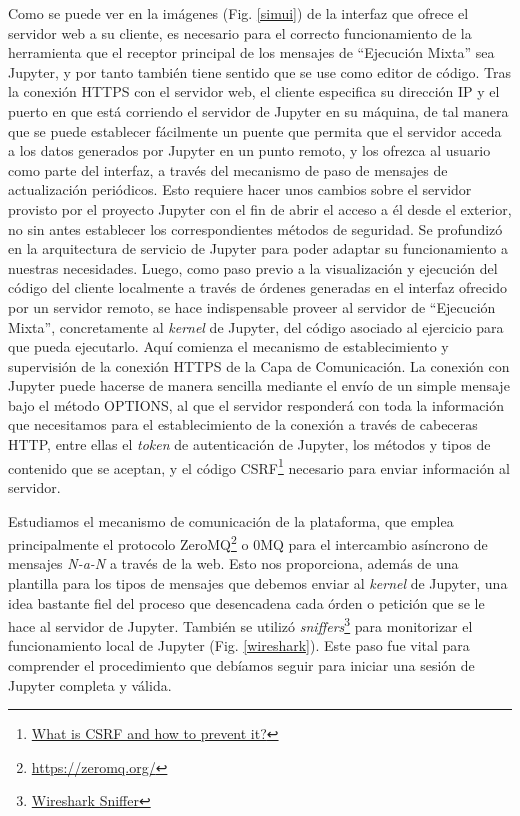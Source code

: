 Como se puede ver en la imágenes (Fig. \ref{simui}) de la interfaz que ofrece el servidor web a su cliente, es necesario para el correcto funcionamiento de la herramienta que el receptor principal de los mensajes de ``Ejecución Mixta'' sea Jupyter, y por tanto también tiene sentido que se use como editor de código. Tras la conexión HTTPS con el servidor web, el cliente especifica su dirección IP y el puerto en que está corriendo el servidor de Jupyter en su máquina, de tal manera que se puede establecer fácilmente un puente que permita que el servidor acceda a los datos generados por Jupyter en un punto remoto, y los ofrezca al usuario como parte del interfaz, a través del mecanismo de paso de mensajes de actualización periódicos. Esto requiere hacer unos cambios sobre el servidor provisto por el proyecto Jupyter con el fin de abrir el acceso a él desde el exterior, no sin antes establecer los correspondientes métodos de seguridad. Se profundizó en la arquitectura de servicio de Jupyter para poder adaptar su funcionamiento a nuestras necesidades. Luego, como paso previo a la visualización y ejecución del código del cliente localmente a través de órdenes generadas en el interfaz ofrecido por un servidor remoto, se hace indispensable proveer al servidor de ``Ejecución Mixta'', concretamente al \textit{kernel} de Jupyter, del código asociado al ejercicio para que pueda ejecutarlo. Aquí comienza el mecanismo de establecimiento y supervisión de la conexión HTTPS de la Capa de Comunicación. La conexión con Jupyter puede hacerse de manera sencilla mediante el envío de un simple mensaje bajo el método OPTIONS, al que el servidor responderá con toda la información que necesitamos para el establecimiento de la conexión a través de cabeceras HTTP, entre ellas el \textit{token} de autenticación de Jupyter, los métodos y tipos de contenido que se aceptan, y el código CSRF\footnote{\href{https://www.geeksforgeeks.org/what-is-cross-site-request-forgery-csrf/}{What is CSRF and how to prevent it?}} necesario para enviar información al servidor.

Estudiamos el mecanismo de comunicación de la plataforma, que emplea principalmente el protocolo ZeroMQ\footnote{\url{https://zeromq.org/}} o 0MQ para el intercambio asíncrono de mensajes \textit{N-a-N} a través de la web. Esto nos proporciona, además de una plantilla para los tipos de mensajes que debemos enviar al \textit{kernel} de Jupyter, una idea bastante fiel del proceso que desencadena cada órden o petición que se le hace al servidor de Jupyter. También se utilizó \textit{sniffers}\footnote{\href{https://www.wireshark.org/\#1398253364-1-69}{Wireshark Sniffer}} para monitorizar el funcionamiento local de Jupyter (Fig. \ref{wireshark}). Este paso fue vital para comprender el procedimiento que debíamos seguir para iniciar una sesión de Jupyter completa y válida.

